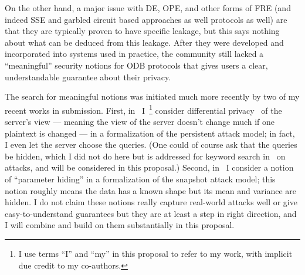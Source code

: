 On the other hand, a major issue with DE, OPE, and other forms of FRE (and indeed SSE and garbled circuit based approaches as well protocols as well) are that they are typically proven to have specific leakage, but this says nothing about what can be deduced from this leakage.  After they were developed and incorporated into systems used in practice, the community still lacked a ``meaningful'' security notions for ODB protocols that  gives users a clear, understandable guarantee about their privacy. 
\fi
\iffalse

The search for meaningful notions was initiated much more recently by two of my recent works in submission. First, in~\cite{KKNO17} I~\footnote{I use terms ``I'' and ``my'' in this proposal to refer to my  work, with implicit due credit to my co-authors.} consider
differential privacy~\cite{DMNS06,DKMMN06} of the server's view --- meaning the view of the server doesn't change much if one plaintext is changed --- in a  formalization of the persistent attack model; in fact, I even let the server choose the queries. (One could of course ask that the queries be hidden, which I did not do here but is addressed for keyword search in~\cite{HO18} on attacks, and will be considered in this proposal.)  Second, in~\cite{CLOZZ18} I consider a notion of ``parameter hiding'' in a formalization of the snapshot attack model; this notion roughly means the data has a known shape but its mean and variance are hidden. I do not claim these notions really capture real-world attacks well or give easy-to-understand guarantees but they are at least a step in right direction, and I will combine and build on them substantially in this proposal.
 


